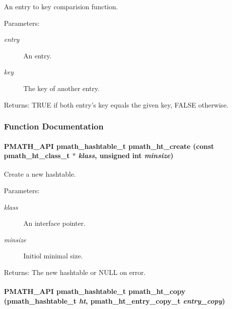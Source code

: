 An entry to key comparision function. 

\begin{Desc}
\item[Parameters:]
\begin{description}
\item[{\em entry}]An entry. \item[{\em key}]The key of another entry. \end{description}
\end{Desc}
\begin{Desc}
\item[Returns:]TRUE if both entry's key equals the given key, FALSE otherwise. \end{Desc}


\subsubsection{Function Documentation}
\hypertarget{group__hashtables_g6835e6b0d0b308ef15f4f885298078f5}{
\paragraph[{pmath\_\-ht\_\-create}]{\setlength{\rightskip}{0pt plus 5cm}PMATH\_\-API {\bf pmath\_\-hashtable\_\-t} pmath\_\-ht\_\-create (const pmath\_\-ht\_\-class\_\-t $\ast$ {\em klass}, \/  unsigned int {\em minsize})}\hfill}
\label{group__hashtables_g6835e6b0d0b308ef15f4f885298078f5}


Create a new hashtable. 

\begin{Desc}
\item[Parameters:]
\begin{description}
\item[{\em klass}]An interface pointer. \item[{\em minsize}]Initiol minimal size. \end{description}
\end{Desc}
\begin{Desc}
\item[Returns:]The new hashtable or NULL on error. \end{Desc}
\hypertarget{group__hashtables_gf82265c2aff9bb75eb7beb057a812aa3}{
\paragraph[{pmath\_\-ht\_\-copy}]{\setlength{\rightskip}{0pt plus 5cm}PMATH\_\-API {\bf pmath\_\-hashtable\_\-t} pmath\_\-ht\_\-copy ({\bf pmath\_\-hashtable\_\-t} {\em ht}, \/  {\bf pmath\_\-ht\_\-entry\_\-copy\_\-t} {\em entry\_\-copy})}\hfill}
\label{group__hashtables_gf82265c2aff9bb75eb7beb057a812aa3}


